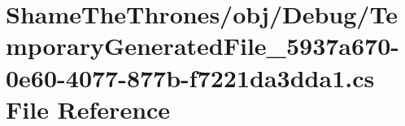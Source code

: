 \hypertarget{obj_2_debug_2_temporary_generated_file__5937a670-0e60-4077-877b-f7221da3dda1_8cs}{}\section{Shame\+The\+Thrones/obj/\+Debug/\+Temporary\+Generated\+File\+\_\+5937a670-\/0e60-\/4077-\/877b-\/f7221da3dda1.cs File Reference}
\label{obj_2_debug_2_temporary_generated_file__5937a670-0e60-4077-877b-f7221da3dda1_8cs}
